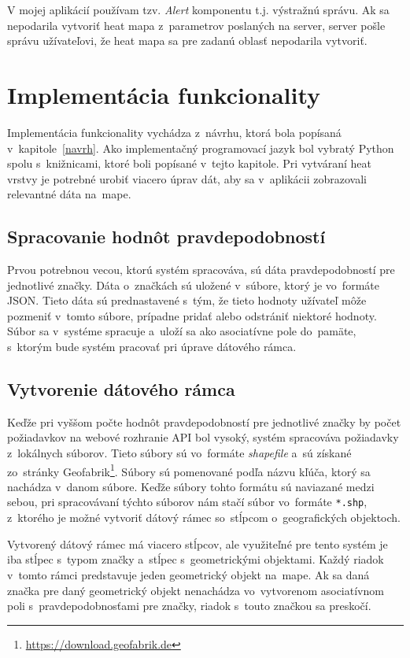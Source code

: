 V mojej aplikácií používam tzv. \emph{Alert} komponentu t.j. výstražnú správu. Ak sa nepodarila vytvoriť heat mapa z~parametrov poslaných na server, server pošle správu užívateľovi, že heat mapa sa pre zadanú oblasť nepodarila vytvoriť.


\section{Implementácia funkcionality}
Implementácia funkcionality vychádza z~návrhu, ktorá bola popísaná v~kapitole~\ref{navrh}. Ako implementačný programovací jazyk bol vybratý Python spolu s~knižnicami, ktoré boli popísané v~tejto kapitole. Pri vytváraní heat vrstvy je potrebné urobiť viacero úprav dát, aby sa v~aplikácii zobrazovali relevantné dáta na~mape.

\subsection*{Spracovanie hodnôt pravdepodobností}
Prvou potrebnou vecou, ktorú systém spracováva, sú dáta pravdepodobností pre jednotlivé značky. Dáta o~značkách sú uložené v~súbore, ktorý je vo~formáte JSON. Tieto dáta sú prednastavené s~tým, že tieto hodnoty užívateľ môže pozmeniť v~tomto súbore, prípadne pridať alebo odstrániť niektoré hodnoty. Súbor sa v~systéme spracuje a~uloží sa ako asociatívne pole do~pamäte, s~ktorým bude systém pracovať pri úprave dátového rámca.

\subsection*{Vytvorenie dátového rámca}
Keďže pri vyššom počte hodnôt pravdepodobností pre jednotlivé značky by počet požiadavkov na webové rozhranie API bol vysoký, systém spracováva požiadavky z~lokálnych súborov. Tieto súbory sú vo~formáte \emph{shapefile} a~sú získané zo~stránky Geofabrik\footnote{\url{https://download.geofabrik.de}}. Súbory sú pomenované podľa názvu kľúča, ktorý sa nachádza v~danom súbore. Keďže súbory tohto formátu sú naviazané medzi sebou, pri spracovávaní týchto súborov nám stačí súbor vo~formáte \texttt{*.shp}, z~ktorého je možné vytvoriť dátový rámec so~stĺpcom o~geografických objektoch.

Vytvorený dátový rámec má viacero stĺpcov, ale využiteľné pre tento systém je iba stĺpec s~typom značky a~stĺpec s~geometrickými objektami. Každý riadok v~tomto rámci predstavuje jeden geometrický objekt na~mape. Ak sa daná značka pre daný geometrický objekt nenachádza vo~vytvorenom asociatívnom poli s~pravdepodobnosťami pre značky, riadok s~touto značkou sa preskočí.

